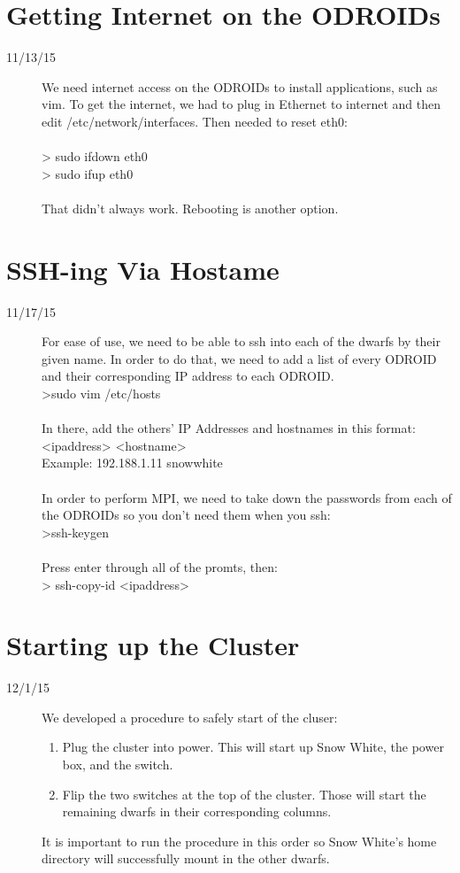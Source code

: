 \section{Getting Internet on the ODROIDs}
\begin{description}
\item [11/13/15] We need internet access on the ODROIDs to install applications, such as vim. To get the internet, we had to plug in Ethernet to internet and then edit /etc/network/interfaces. Then needed to reset eth0: \\ \\
> sudo ifdown eth0 \\
> sudo ifup eth0 \\ \\
That didn't always work. Rebooting is another option.
\end{description}

\section{SSH-ing Via Hostame}
\begin{description}
\item [11/17/15] For ease of use, we need to be able to ssh into each of the dwarfs by their given name. In order to do that, we need to add a list of every ODROID and their corresponding IP address to each ODROID. \\
>sudo vim /etc/hosts \\ \\
In there, add the others' IP Addresses and hostnames in this format: \\
<ipaddress> <hostname> \\
Example: 192.188.1.11 snowwhite \\ \\
In order to perform MPI, we need to take down the passwords from each of the ODROIDs so you don't need them when you ssh: \\
>ssh-keygen \\ \\
Press enter through all of the promts, then: \\
> ssh-copy-id <ipaddress>
\end{description}

\section{Starting up the Cluster}
\begin{description}
\item [12/1/15] We developed a procedure to safely start of the cluser:
\begin{enumerate}
	\item Plug the cluster into power. This will start up Snow White, the power box, and the switch.
	\item Flip the two switches at the top of the cluster. Those will start the remaining dwarfs in their corresponding columns.
\end{enumerate}
It is important to run the procedure in this order so Snow White's home directory will successfully mount in the other dwarfs.
\end{description}

